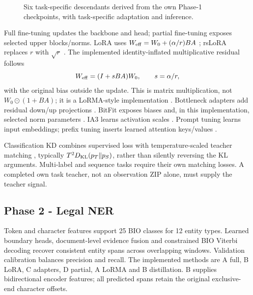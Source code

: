 \documentclass[11pt, oneside]{article}
\begin{document}
\begin{figure}[htbp]
{}
\caption{Six task-specific descendants derived from the own Phase-1 checkpoints, with task-specific adaptation and inference.}
\label{fig:arch_flow}\end{figure}

Full fine-tuning updates the backbone and head; partial fine-tuning exposes selected
upper blocks/norms. LoRA uses $W_{\rm eff}=W_0+(\alpha/r)BA$ ;
rsLoRA replaces $r$ with $\sqrt r$ . The implemented
identity-inflated multiplicative residual follows
\begin{equation}
W_{\rm eff}=(I+sBA)W_0,\qquad s=\alpha/r,
\end{equation}
with the original bias outside the update. This is matrix multiplication, not
$W_0\odot(1+BA)$; it is a LoRMA-style implementation \cite{bihany2025lorma}.
Bottleneck adapters add residual down/up projections .
BitFit exposes biases and, in this implementation, selected norm parameters
. IA3 learns activation scales . Prompt tuning
learns input embeddings; prefix tuning inserts learned attention keys/values
.

Classification KD combines supervised loss with temperature-scaled teacher matching
, typically $T^2D_{\rm KL}(p_T\|p_S)$, rather than
silently reversing the KL arguments. Multi-label and sequence tasks require their
own matching losses. A completed own task teacher, not an observation ZIP alone,
must supply the teacher signal.

\subsection{Phase 2 - Legal NER}
Token and character features support 25 BIO classes for 12 entity types. Learned
boundary heads, document-level evidence fusion and constrained BIO Viterbi decoding
recover consistent entity spans across overlapping windows. Validation calibration
balances precision and recall. The implemented methods are A full, B LoRA, C adapters,
D partial, A LoRMA and B distillation. B supplies bidirectional encoder features;
all predicted spans retain the original exclusive-end character offsets.
\end{document}
